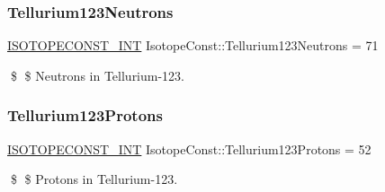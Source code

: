 \subsubsection{\texorpdfstring{Tellurium123\+Neutrons}{Tellurium123Neutrons}}
{\footnotesize\ttfamily \mbox{\hyperlink{group___isotope_const-_macros_ga5f18360b3e99483a35c32d789e62621c}{I\+S\+O\+T\+O\+P\+E\+C\+O\+N\+S\+T\+\_\+\+I\+NT}} Isotope\+Const\+::\+Tellurium123\+Neutrons = 71}

\$ \$ Neutrons in Tellurium-\/123. \mbox{\label{group___isotope_const-_tellurium-_te123_gab0a2bb6d32f347892840b8bd1c7c7512}} 
\subsubsection{\texorpdfstring{Tellurium123\+Protons}{Tellurium123Protons}}
{\footnotesize\ttfamily \mbox{\hyperlink{group___isotope_const-_macros_ga5f18360b3e99483a35c32d789e62621c}{I\+S\+O\+T\+O\+P\+E\+C\+O\+N\+S\+T\+\_\+\+I\+NT}} Isotope\+Const\+::\+Tellurium123\+Protons = 52}

\$ \$ Protons in Tellurium-\/123. 